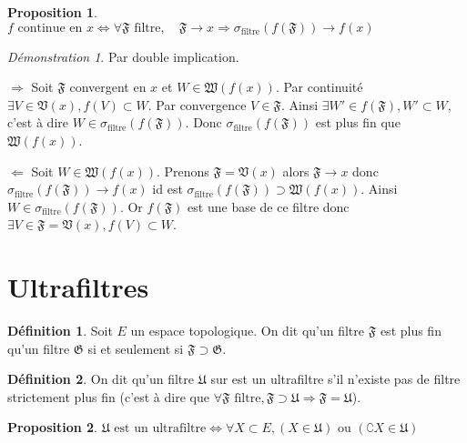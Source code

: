 \documentclass[a4paper, 11pt, french]{book}
\newenvironment{itemise}{\itemize}{\enditemize}
\theoremstyle{plain} %
\newtheorem{proposition}{Proposition}
\theoremstyle{definition} %
\newtheorem{definition}{Définition}
\theoremstyle{remark} %
\newtheorem*{demonstration}{Démonstration}
\newcommand{\1}{\mathds{1}}
\newcommand\ou{\text{ ou }}
\begin{document}
\begin{proposition}
	$f\text{ continue en }x\iff\forall\mathfrak{F}\text{ filtre},\quad\mathfrak{F}\rightarrow x\Rightarrow\sigma_\text{filtre}(f(\mathfrak{F}))\rightarrow f(x)$
\end{proposition}

\begin{demonstration}
	Par double implication.
	\begin{itemise}
		\item[$\Rightarrow$] Soit $\mathfrak{F}$ convergent en $x$ et $W\in\mathfrak{W}(f(x))$.
		Par continuité $\exists V\in\mathfrak{V}(x), f(V)\subset W$.
		Par convergence $V\in\mathfrak{F}$.
		Ainsi $\exists W'\in f(\mathfrak{F}), W'\subset W$, c'est à dire $W\in\sigma_\text{filtre}(f(\mathfrak{F}))$.
		Donc $\sigma_\text{filtre}(f(\mathfrak{F}))$ est plus fin que $\mathfrak{W}(f(x))$.
		\item[$\Leftarrow$] Soit $W\in\mathfrak{W}(f(x))$.
		Prenons $\mathfrak{F}=\mathfrak{V}(x)$ alors $\mathfrak{F}\rightarrow x$ donc $\sigma_\text{filtre}(f(\mathfrak{F}))\rightarrow f(x)$ id est $\sigma_\text{filtre}(f(\mathfrak{F}))\supset\mathfrak{W}(f(x))$.
		Ainsi $W\in\sigma_\text{filtre}(f(\mathfrak{F}))$.
		Or $f(\mathfrak{F})$ est une base de ce filtre donc $\exists V\in\mathfrak{F}=\mathfrak{V}(x), f(V)\subset W$.
	\end{itemise}
\end{demonstration}

\section{Ultrafiltres}

\begin{definition}
	Soit $E$ un espace topologique.
	On dit qu'un filtre $\mathfrak{F}$ est plus fin qu'un filtre $\mathfrak{G}$ si et seulement si $\mathfrak{F}\supset\mathfrak{G}$.
\end{definition}

\begin{definition}
	On dit qu'un filtre $\mathfrak{U}$ sur est un ultrafiltre s'il n'existe pas de filtre strictement plus fin (c'est à dire que $\forall\mathfrak{F}\text{ filtre}, \mathfrak{F}\supset\mathfrak{U}\Rightarrow\mathfrak{F}=\mathfrak{U}$).
\end{definition}

\begin{proposition}
	$\mathfrak{U}\text{ est un ultrafiltre}\iff\forall X\subset E, (X\in\mathfrak{U})\ou(\complement X\in\mathfrak{U})$
\end{proposition}
\end{document}
